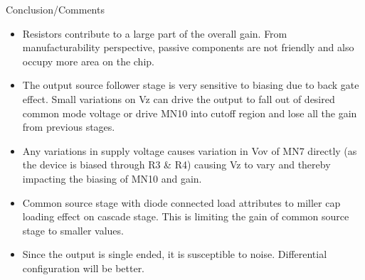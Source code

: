 \documentclass[12pt,a4paper]{article}
\begin{document}
Conclusion/Comments



\begin{itemize}
\item Resistors contribute to a large part of the overall gain. From 
manufacturability perspective, passive components are not friendly and 
also occupy more area on the chip.
\item The output source follower stage is very sensitive to biasing due 
to back gate effect. Small variations on Vz can drive the output to fall 
out of desired common mode voltage or drive MN10 into cutoff region and 
lose all the gain from previous stages.
\item Any variations in supply voltage causes variation in Vov of MN7 
directly (as the device is biased through R3 \& R4) causing Vz to vary 
and thereby impacting the biasing of MN10 and gain.
\item Common source stage with diode connected load attributes to miller 
cap loading effect on cascade stage. This is limiting the gain of common 
source stage to smaller values.
\item Since the output is single ended, it is susceptible to noise. 
Differential configuration will be better.
\end{itemize}
\end{document}
